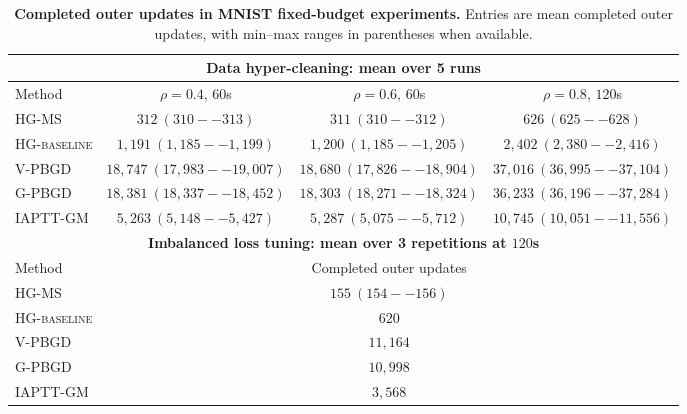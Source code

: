 \documentclass{article}
\theoremstyle{normaltheorem}
\begin{document}
\begin{table}[t]
  \centering
  \caption{\textbf{Completed outer updates in MNIST fixed-budget experiments.}
  Entries are mean completed outer updates, with min--max ranges in parentheses when available.}
  \label{tab:mnist-outer-updates}
  \begin{adjustbox}{max width=\linewidth}
  \begin{tabular}{lccc}
    \toprule
    \multicolumn{4}{c}{\textbf{Data hyper-cleaning: mean over 5 runs}} \\
    \midrule
    Method & \(\rho=0.4\), \(60\)s & \(\rho=0.6\), \(60\)s & \(\rho=0.8\), \(120\)s \\
    \midrule
    \textsc{HG-MS} & \(312\ (310--313)\) & \(311\ (310--312)\) & \(626\ (625--628)\) \\
    \textsc{HG-baseline} & \(1{,}191\ (1{,}185--1{,}199)\) & \(1{,}200\ (1{,}185--1{,}205)\) & \(2{,}402\ (2{,}380--2{,}416)\) \\
    V-PBGD & \(18{,}747\ (17{,}983--19{,}007)\) & \(18{,}680\ (17{,}826--18{,}904)\) & \(37{,}016\ (36{,}995--37{,}104)\) \\
    G-PBGD & \(18{,}381\ (18{,}337--18{,}452)\) & \(18{,}303\ (18{,}271--18{,}324)\) & \(36{,}233\ (36{,}196--37{,}284)\) \\
    IAPTT-GM & \(5{,}263\ (5{,}148--5{,}427)\) & \(5{,}287\ (5{,}075--5{,}712)\) & \(10{,}745\ (10{,}051--11{,}556)\) \\
    \midrule
    \multicolumn{4}{c}{\textbf{Imbalanced loss tuning: mean over 3 repetitions at \(120\)s}} \\
    \midrule
    Method & \multicolumn{3}{c}{Completed outer updates} \\
    \midrule
    \textsc{HG-MS} & \multicolumn{3}{c}{\(155\ (154--156)\)} \\
    \textsc{HG-baseline} & \multicolumn{3}{c}{\(620\)} \\
    V-PBGD & \multicolumn{3}{c}{\(11{,}164\)} \\
    G-PBGD & \multicolumn{3}{c}{\(10{,}998\)} \\
    IAPTT-GM & \multicolumn{3}{c}{\(3{,}568\)} \\
    \bottomrule
  \end{tabular}
  \end{adjustbox}
\end{table}




\end{document}
